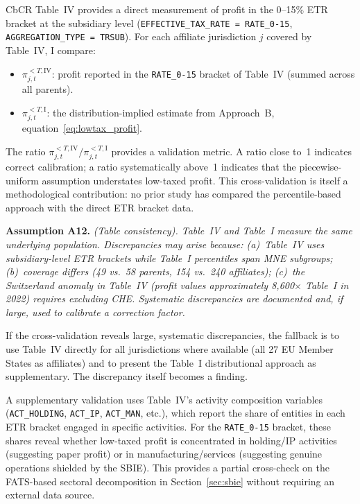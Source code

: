 \documentclass[11pt,a4paper]{article}
\newcommand{\code}[1]{\texttt{#1}}
\newcommand{\assumption}[2]{\noindent\textbf{Assumption #1.} \textit{#2}\medskip}
\begin{document}
CbCR Table~IV provides a direct measurement of profit in the 0--15\% ETR bracket at the subsidiary level (\code{EFFECTIVE\_TAX\_RATE = RATE\_0-15}, \code{AGGREGATION\_TYPE = TRSUB}). For each affiliate jurisdiction $j$ covered by Table~IV, I compare:

\begin{itemize}
\item $\pi_{j,t}^{<T,\text{IV}}$: profit reported in the \code{RATE\_0-15} bracket of Table~IV (summed across all parents).
\item $\pi_{j,t}^{<T,\text{I}}$: the distribution-implied estimate from Approach~B, equation~\eqref{eq:lowtax_profit}.
\end{itemize}

The ratio $\pi_{j,t}^{<T,\text{IV}} / \pi_{j,t}^{<T,\text{I}}$ provides a validation metric. A ratio close to~1 indicates correct calibration; a ratio systematically above~1 indicates that the piecewise-uniform assumption understates low-taxed profit. This cross-validation is itself a methodological contribution: no prior study has compared the percentile-based approach with the direct ETR bracket data.

\assumption{A12}{(Table consistency). Table~IV and Table~I measure the same underlying population. Discrepancies may arise because: (a)~Table~IV uses subsidiary-level ETR brackets while Table~I percentiles span MNE subgroups; (b)~coverage differs (49 vs.\ 58 parents, 154 vs.\ 240 affiliates); (c)~the Switzerland anomaly in Table~IV (profit values approximately 8,600$\times$ Table~I in 2022) requires excluding CHE. Systematic discrepancies are documented and, if large, used to calibrate a correction factor.}

If the cross-validation reveals large, systematic discrepancies, the fallback is to use Table~IV directly for all jurisdictions where available (all 27 EU Member States as affiliates) and to present the Table~I distributional approach as supplementary. The discrepancy itself becomes a finding.

A supplementary validation uses Table~IV's activity composition variables (\code{ACT\_HOLDING}, \code{ACT\_IP}, \code{ACT\_MAN}, etc.), which report the share of entities in each ETR bracket engaged in specific activities. For the \code{RATE\_0-15} bracket, these shares reveal whether low-taxed profit is concentrated in holding/IP activities (suggesting paper profit) or in manufacturing/services (suggesting genuine operations shielded by the SBIE). This provides a partial cross-check on the FATS-based sectoral decomposition in Section~\ref{sec:sbie} without requiring an external data source.
\end{document}
